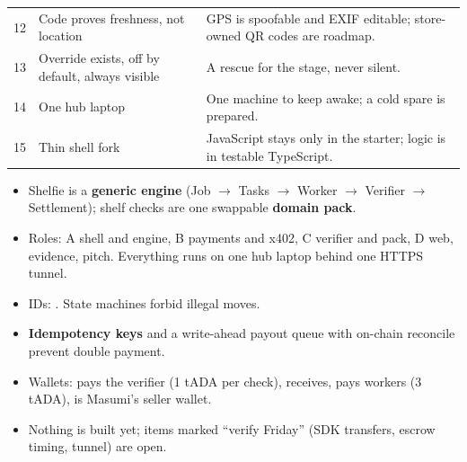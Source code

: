 \begin{center}
\begin{tabularx}{\textwidth}{@{}p{1.2cm}p{3.5cm}X@{}}
12 & Code proves freshness, not location & GPS is spoofable and EXIF editable; store-owned QR codes are roadmap.\\
13 & Override exists, off by default, always visible & A rescue for the stage, never silent.\\
14 & One hub laptop & One machine to keep awake; a cold spare is prepared.\\
15 & Thin shell fork & JavaScript stays only in the starter; logic is in testable TypeScript.\\
\bottomrule
\end{tabularx}
\end{center}

\begin{keypoints}
\begin{itemize}
  \item Shelfie is a \textbf{generic engine} (Job $\rightarrow$ Tasks $\rightarrow$ Worker $\rightarrow$ Verifier $\rightarrow$ Settlement); shelf checks are one swappable \textbf{domain pack}.
  \item Roles: A shell and engine, B payments and x402, C verifier and pack, D web, evidence, pitch. Everything runs on one hub laptop behind one HTTPS tunnel.
  \item IDs: . State machines forbid illegal moves.
  \item \textbf{Idempotency keys} and a write-ahead payout queue with on-chain reconcile prevent double payment.
  \item Wallets:  pays the verifier (1 tADA per check),  receives,  pays workers (3 tADA),  is Masumi's seller wallet.
  \item Nothing is built yet; items marked ``verify Friday'' (SDK transfers, escrow timing, tunnel) are open.
\end{itemize}
\end{keypoints}

